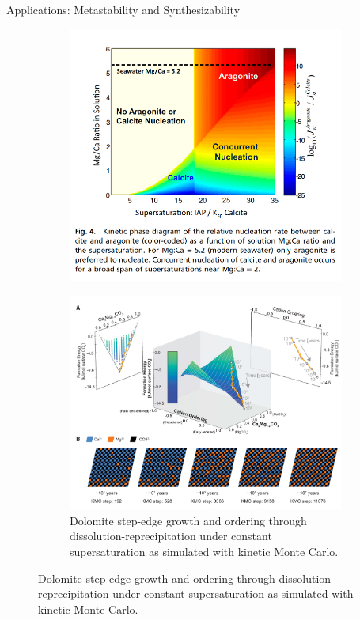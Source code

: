 \documentclass[aspectratio=169]{beamer}
\begin{document}
\begin{frame}{Applications: Metastability and Synthesizability}

\begin{figure}
    \centering
    \begin{subfigure}{0.45\textwidth}
        \centering
        \includegraphics[width=\linewidth]{lectures/figures/11_metastable.png}
        \caption{\cite{sunCorrectionSunNucleation2015}}
    \end{subfigure}
    \begin{subfigure}{0.45\textwidth}
        \centering
        \includegraphics[width=0.9\linewidth]{lectures/figures/11_dolomite.png}
    \caption{Dolomite step-edge growth and ordering through dissolution-reprecipitation under constant supersaturation as simulated with kinetic Monte Carlo.\cite{kimDissolutionEnablesDolomite2023}}
    \end{subfigure}
\end{figure} 

\end{frame} 
\end{document}
